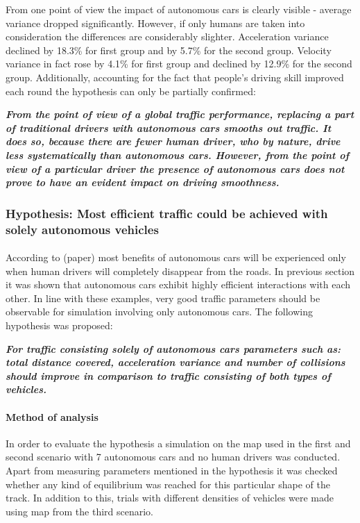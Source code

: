 \documentclass[11pt,english]{article}
\begin{document}
From one point of view the impact of autonomous cars is clearly visible - average variance dropped significantly. However, if only humans are taken into consideration the differences are considerably slighter. Acceleration variance declined by 18.3\% for first group and by 5.7\% for the second group. Velocity variance in fact rose by 4.1\% for first group and declined by 12.9\% for the second group. Additionally, accounting for the fact that people's driving skill improved each round the hypothesis can only be partially confirmed:

\textbf{\textit{From the point of view of a global traffic performance, replacing a part of traditional drivers with autonomous cars smooths out traffic. It does so, because there are fewer human driver, who by nature, drive less systematically than autonomous cars. However, from the point of view of a particular driver the presence of autonomous cars does not prove to have an evident impact on driving smoothness.}}





\subsubsection{Hypothesis: Most efficient traffic could be achieved with solely autonomous vehicles}
\paragraph{}
According to (paper) most benefits of autonomous cars will be experienced only when human drivers will completely disappear from the roads. In previous section it was shown that autonomous cars exhibit highly efficient interactions with each other. In line with these examples, very good traffic parameters should be observable for simulation involving only autonomous cars. The following hypothesis was proposed:

\textbf{\textit{For traffic consisting solely of autonomous cars parameters such as: total distance covered, acceleration variance and number of collisions should improve in comparison to traffic consisting of both types of vehicles.}}

\paragraph{Method of analysis}
In order to evaluate the hypothesis a simulation on the map used in the first and second scenario with 7 autonomous cars and no human drivers was conducted. Apart from measuring parameters mentioned in the hypothesis it was checked whether any kind of equilibrium was reached for this particular shape of the track. In addition to this, trials with different densities of vehicles were made using map from the third scenario. 
\end{document}
